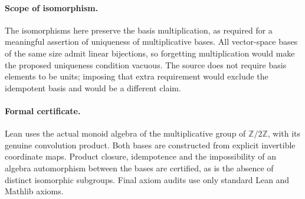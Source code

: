 \documentclass[11pt]{article}
\begin{document}
\paragraph{Scope of isomorphism.}
The isomorphisms here preserve the basis multiplication, as required
for a meaningful assertion of uniqueness of multiplicative bases.
All vector-space bases of the same size admit linear bijections,
so forgetting multiplication would make the proposed uniqueness
condition vacuous. The source does not require basis elements to
be units; imposing that extra requirement would exclude the
idempotent basis and would be a different claim.

\paragraph{Formal certificate.}
Lean uses the actual monoid algebra of the multiplicative group of
$\mathbb Z/2\mathbb Z$, with its genuine convolution product.
Both bases are constructed from explicit invertible coordinate
maps. Product closure, idempotence and the impossibility of an
algebra automorphism between the bases are certified, as is the
absence of distinct isomorphic subgroups. Final axiom audits use
only standard Lean and Mathlib axioms.
\end{document}
